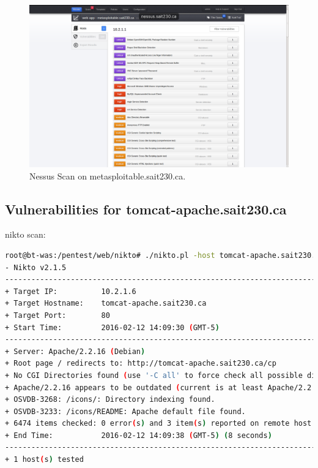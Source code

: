 \documentclass{article}
\begin{document}
\begin{figure}[h!]
	\includegraphics[width=\linewidth]{images/nessus-metasploitable.png}
	\caption{Nessus Scan on metasploitable.sait230.ca.}
	\label{fig:nessus-metasploitable}
\end{figure}

\subsection{Vulnerabilities for tomcat-apache.sait230.ca}
nikto scan:

\begin{lstlisting}[language=Bash]
root@bt-was:/pentest/web/nikto# ./nikto.pl -host tomcat-apache.sait230.ca -p 80
- Nikto v2.1.5
---------------------------------------------------------------------------
+ Target IP:          10.2.1.6
+ Target Hostname:    tomcat-apache.sait230.ca
+ Target Port:        80
+ Start Time:         2016-02-12 14:09:30 (GMT-5)
---------------------------------------------------------------------------
+ Server: Apache/2.2.16 (Debian)
+ Root page / redirects to: http://tomcat-apache.sait230.ca/cp
+ No CGI Directories found (use '-C all' to force check all possible dirs)
+ Apache/2.2.16 appears to be outdated (current is at least Apache/2.2.19). Apache 1.3.42 (final release) and 2.0.64 are also current.
+ OSVDB-3268: /icons/: Directory indexing found.
+ OSVDB-3233: /icons/README: Apache default file found.
+ 6474 items checked: 0 error(s) and 3 item(s) reported on remote host
+ End Time:           2016-02-12 14:09:38 (GMT-5) (8 seconds)
---------------------------------------------------------------------------
+ 1 host(s) tested
\end{lstlisting}
\end{document}
